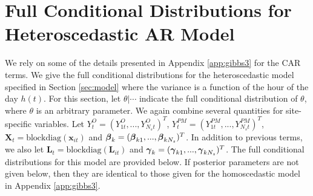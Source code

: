 \documentclass[alpha-refs]{wiley-article}
\newcommand{\bbeta}{ \mbox{\boldmath $ \beta $} }
\newcommand{\bgamma}{ \mbox{\boldmath $\gamma$} }
\newcommand{\bL}{\textbf{L}}
\newcommand{\bx}{\textbf{x}}
\newcommand{\bX}{\textbf{X}}
\begin{document}
\section{Full Conditional Distributions for Heteroscedastic AR Model}\label{app:gibbs4}

We rely on some of the details presented in Appendix \ref{app:gibbs3} for the CAR terms. We give the full conditional distributions for the heteroscedastic model specified in Section \ref{sec:model} where the variance is a function of the hour of the day $h(t)$. For this section, let $\theta | \cdots$ indicate the full conditional distribution of $\theta$, where $\theta$ is an arbitrary parameter. We again combine several quantities for site-specific variables. Let $Y_t^O = (Y_{1t}^O,...,Y_{N_s t}^O)^T$, $Y_t^{PM} = (Y_{1t}^{PM},...,Y_{N_s t}^{PM})^T$, $\bX_t = \text{blockdiag}(\bx_{it} )$ and $\bbeta_k = (\bbeta_{k1} ,...,\bbeta_{k N_s})^T$. In addition to previous terms, we also let $\bL_t = \text{blockdiag}(\bL_{it})$ and $\bgamma_k = (\bgamma_{k1} ,...,\bgamma_{k N_s})^T$. The full conditional distributions for this model are provided below. If posterior parameters are not given below, then they are identical to those given for the homoscedastic model in Appendix \ref{app:gibbs3}.
\end{document}
